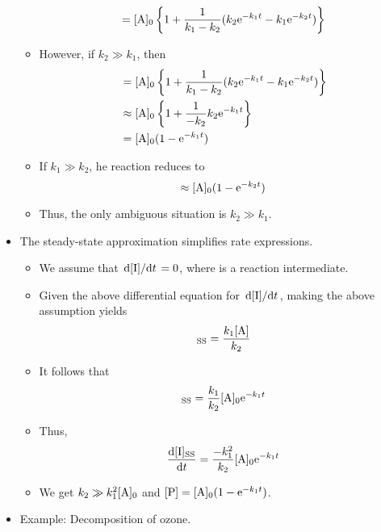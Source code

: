 \documentclass[../notes.tex]{subfiles}
\begin{document}
\begin{itemize}
\begin{itemize}
        \begin{equation*}
            [\ce{P}] = [\ce{A}]_0\left\{ 1+\frac{1}{k_1-k_2}(k_2\e[-k_1t]-k_1\e[-k_2t]) \right\}
        \end{equation*}
        \item However, if $k_2\gg k_1$, then
        \begin{align*}
            [\ce{P}] &= [\ce{A}]_0\left\{ 1+\frac{1}{k_1-k_2}(k_2\e[-k_1t]-k_1\e[-k_2t]) \right\}\\
            &\approx [\ce{A}]_0\left\{ 1+\frac{1}{-k_2}k_2\e[-k_1t] \right\}\\
            &= [\ce{A}]_0(1-\e[-k_1t])
        \end{align*}
        \item If $k_1\gg k_2$, he reaction reduces to
        \begin{equation*}
            [\ce{P}] \approx [\ce{A}]_0(1-\e[-k_2t])
        \end{equation*}
        \item Thus, the only ambiguous situation is $k_2\gg k_1$.
    \end{itemize}
    \item The steady-state approximation simplifies rate expressions.
    \begin{itemize}
        \item We assume that $\dv*{[\ce{I}]}{t}=0$, where  is a reaction intermediate.
        \item Given the above differential equation for $\dv*{[\ce{I}]}{t}$, making the above assumption yields
        \begin{equation*}
            [\ce{I}]_\text{SS} = \frac{k_1[\ce{A}]}{k_2}
        \end{equation*}
        \item It follows that
        \begin{equation*}
            [\ce{I}]_\text{SS} = \frac{k_1}{k_2}[\ce{A}]_0\e[-k_1t]
        \end{equation*}
        \item Thus,
        \begin{equation*}
            \dv{[\ce{I}]_\text{SS}}{t} = \frac{-k_1^2}{k_2}[\ce{A}]_0\e[-k_1t]
        \end{equation*}
        \item We get $k_2\gg k_1^2[\ce{A}]_0$ and $[\ce{P}]=[\ce{A}]_0(1-\e[-k_1t])$.
    \end{itemize}
    \item Example: Decomposition of ozone.

\end{itemize}
\end{document}
